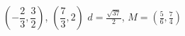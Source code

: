 {$\left(- \dfrac{2}{3}, \dfrac{3}{2} \right)$, $\left(\dfrac{7}{3}, 2\right)$ }
{$d= \frac{\sqrt{37}}{2}$, $M = \left(\frac{5}{6}, \frac{7}{4} \right)$}